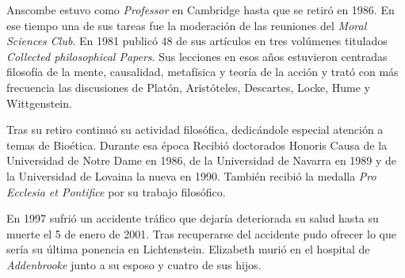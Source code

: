 Anscombe estuvo como \emph{Professor} en Cambridge hasta que se retiró en 1986. En ese tiempo una de sus tareas fue la moderación de las reuniones del \emph{Moral Sciences Club}. En 1981 publicó 48 de sus artículos en tres volúmenes titulados \emph{Collected philosophical Papers}. Sus lecciones en esos años estuvieron centradas filosofía de la mente, causalidad, metafísica y teoría de la acción y trató con más frecuencia las discusiones de Platón, Aristóteles, Descartes, Locke, Hume y Wittgenstein\autocite[Cf.~][46]{torralba2005accion}.

Tras su retiro continuó su actividad filosófica, dedicándole especial atención a temas de Bioética. Durante esa época Recibió doctorados Honoris Causa de la Universidad de Notre Dame en 1986, de la Universidad de Navarra en 1989 y de la Universidad de Lovaina la nueva en 1990. También recibió la medalla \emph{Pro Ecclesia et Pontifice} por su trabajo filosófico\autocite[Cf.~][48]{torralba2005accion}.

En 1997 sufrió un accidente tráfico que dejaría deteriorada su salud hasta su muerte el 5 de enero de 2001. Tras recuperarse del accidente pudo ofrecer lo que sería su última ponencia en Lichtenstein. Elizabeth murió en el hospital de \emph{Addenbrooke} junto a su esposo y cuatro de sus hijos\autocite[Cf.~][50]{teichman2002fellows}.
